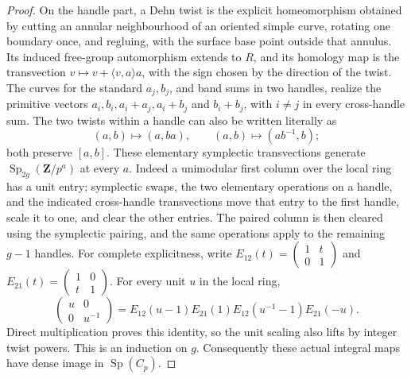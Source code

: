 \begin{proof}
On the handle part, a Dehn twist is the
explicit homeomorphism obtained by cutting
an annular neighbourhood of an oriented
simple curve, rotating one boundary once,
and regluing, with the surface base point
outside that annulus.
Its induced free-group automorphism extends
to \(R\), and its homology map is the
transvection
\(v\mapsto v+\langle v,a\rangle a\), with
the sign chosen by the direction of the twist.
The curves for the standard \(a_j,b_j\),
and band sums in two handles, realize the
primitive vectors \(a_i,b_i,a_i+a_j,a_i+b_j\)
and \(b_i+b_j\), with \(i\ne j\) in every
cross-handle sum.
The two twists within a handle can also be
written literally as
\[
 (a,b)\mapsto(a,ba),\qquad
 (a,b)\mapsto(ab^{-1},b);
 \tag{D.41.6}
\]
both preserve \([a,b]\).
These elementary symplectic transvections
generate \(\operatorname{Sp}_{2g}(\mathbf Z/p^a)\)
at every \(a\).
Indeed a unimodular first column over the
local ring has a unit entry; symplectic swaps,
the two elementary operations on a handle,
and the indicated cross-handle transvections
move that entry to the first handle, scale it
to one, and clear the other entries.
The paired column is then cleared using the
symplectic pairing, and the same operations
apply to the remaining \(g-1\) handles.
For complete explicitness, write
\(E_{12}(t)=\left(\begin{smallmatrix}1&t\\0&1\end{smallmatrix}\right)\)
and
\(E_{21}(t)=\left(\begin{smallmatrix}1&0\\t&1\end{smallmatrix}\right)\).
For every unit \(u\) in the local ring,
\[
 \begin{pmatrix}u&0\\0&u^{-1}\end{pmatrix}
 =
 E_{12}(u-1)E_{21}(1)
 E_{12}(u^{-1}-1)E_{21}(-u).
\]
Direct multiplication proves this identity,
so the unit scaling also lifts by integer
twist powers.  This is an induction on \(g\).
Consequently these actual integral maps have
dense image in \(\operatorname{Sp}(C_p)\).


\end{proof}
